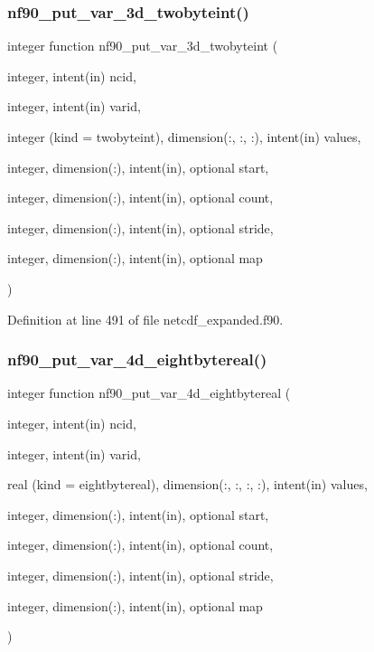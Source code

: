\subsubsection{\texorpdfstring{nf90\+\_\+put\+\_\+var\+\_\+3d\+\_\+twobyteint()}{nf90\_put\_var\_3d\_twobyteint()}}
{\footnotesize\ttfamily integer function nf90\+\_\+put\+\_\+var\+\_\+3d\+\_\+twobyteint (\begin{DoxyParamCaption}\item[{integer, intent(in)}]{ncid,  }\item[{integer, intent(in)}]{varid,  }\item[{integer (kind = twobyteint), dimension(\+:, \+:, \+:), intent(in)}]{values,  }\item[{integer, dimension(\+:), intent(in), optional}]{start,  }\item[{integer, dimension(\+:), intent(in), optional}]{count,  }\item[{integer, dimension(\+:), intent(in), optional}]{stride,  }\item[{integer, dimension(\+:), intent(in), optional}]{map }\end{DoxyParamCaption})}



Definition at line 491 of file netcdf\+\_\+expanded.\+f90.

\mbox{\label{netcdf__expanded_8f90_ae02380d44b00acf5dd1587601c37234e}} 
\subsubsection{\texorpdfstring{nf90\+\_\+put\+\_\+var\+\_\+4d\+\_\+eightbytereal()}{nf90\_put\_var\_4d\_eightbytereal()}}
{\footnotesize\ttfamily integer function nf90\+\_\+put\+\_\+var\+\_\+4d\+\_\+eightbytereal (\begin{DoxyParamCaption}\item[{integer, intent(in)}]{ncid,  }\item[{integer, intent(in)}]{varid,  }\item[{real (kind = eightbytereal), dimension(\+:, \+:, \+:, \+:), intent(in)}]{values,  }\item[{integer, dimension(\+:), intent(in), optional}]{start,  }\item[{integer, dimension(\+:), intent(in), optional}]{count,  }\item[{integer, dimension(\+:), intent(in), optional}]{stride,  }\item[{integer, dimension(\+:), intent(in), optional}]{map }\end{DoxyParamCaption})}



